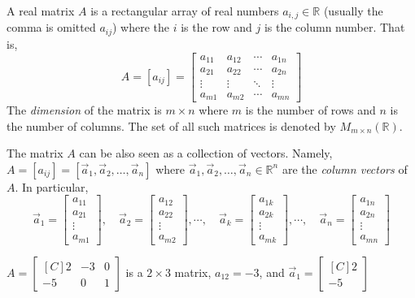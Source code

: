 \begin{definition}[Matrix]
A real matrix $A$ is a rectangular array of real numbers 
$a_{i,j} \in \mathbb{R}$ (usually the comma is omitted $a_{ij}$)  where the $i$ 
is the row and $j$ is the column number. That is, 
\[
A=[a_{ij}]=\begin{bmatrix}
a_{11} & a_{12} & \cdots & a_{1n} \\
a_{21} & a_{22} & \cdots & a_{2n} \\
\vdots & \vdots & \ddots & \vdots \\
a_{m1} & a_{m2} & \cdots & a_{mn} 
\end{bmatrix}
\]
The \emph{dimension} of the matrix is $m\times n$ where $m$ is the number of 
rows and $n$ is the number of columns. The set of all such matrices is denoted 
by $M_{m\times n}(\mathbb{R})$. 
\end{definition}
The matrix $A$ can be also seen as a collection of vectors. Namely, 
$A=[a_{ij}]=[\vec{a}_1, \vec{a}_2, \ldots, \vec{a}_n]$ where 
 $\vec{a}_1, \vec{a}_2,\ldots, \vec{a}_n \in \mathbb{R}^n$ are the \emph{column 
vectors} of $A$. In particular, 
\[
\vec{a}_1=\begin{bmatrix}a_{11}\\a_{21}\\ \vdots \\ a_{m1}\end{bmatrix}, \quad 
\vec{a}_2=\begin{bmatrix}a_{12}\\a_{22}\\ \vdots \\ a_{m2}\end{bmatrix}, 
\cdots, \quad 
\vec{a}_k=\begin{bmatrix}a_{1k}\\a_{2k}\\ \vdots \\ a_{mk}\end{bmatrix}, 
\cdots, \quad 
\vec{a}_n=\begin{bmatrix}a_{1n}\\a_{2n}\\ \vdots \\ a_{mn}\end{bmatrix}
\]

\begin{example}
$A=\begin{bmatrix*}[C]
2 & -3 & 0 \\
-5 & 0 & 1 
\end{bmatrix*}$
is a $2 \times 3$ matrix, $a_{12}=-3$, and  
$\vec{a}_1=\begin{bmatrix*}[C] 2 \\ -5 \end{bmatrix*} $
\end{example}


